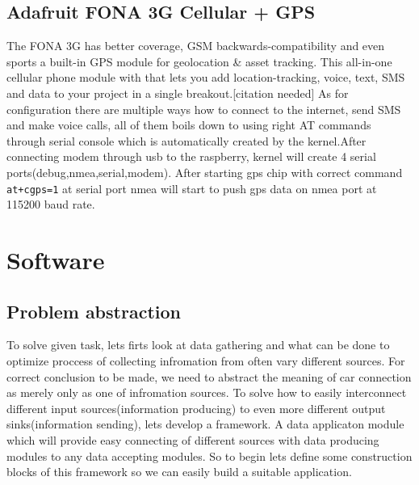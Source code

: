 \subsection{Adafruit FONA 3G Cellular + GPS} %
\label{sub:adafruit_fona_3g_cellular_gps_}
The FONA 3G has better coverage, GSM backwards-compatibility and even sports a built-in GPS module for geolocation & asset tracking. This all-in-one cellular phone module with that lets you add location-tracking, voice, text, SMS and data to your project in a single breakout.[citation needed] As for configuration there are multiple ways how to connect to the internet, send SMS and make voice calls, all of them boils down to using right AT commands through serial console which is automatically created by the kernel.After connecting modem through usb to the raspberry, kernel will create 4 serial ports(debug,nmea,serial,modem). After starting gps chip with correct command \verb|at+cgps=1| at serial port nmea will start to push gps data on nmea port at 115200 baud rate.
\newpage
\section{Software} %
\label{sec:software}
\subsection{Problem abstraction} %
\label{sub:problem_abstraction}
To solve given task, lets firts look at data gathering and what can be done to optimize proccess of collecting infromation from often vary different sources. For correct conclusion to be made, we need to abstract the meaning of car connection as merely only as one of infromation sources. To solve how to easily interconnect different input sources(information producing) to even more different output sinks(information sending), lets develop a framework. A data applicaton module which will provide easy connecting of different sources with data producing modules to any data accepting modules. So to begin lets define some construction blocks of this framework so we can easily build a suitable application.


